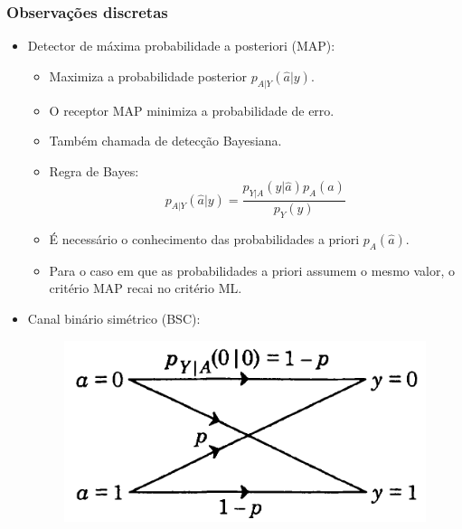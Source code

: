 \begin{frame}
	\frametitle{Observações discretas}

	\begin{itemize}
	    \item Detector de máxima probabilidade a posteriori (MAP):
	    \begin{itemize}
	      \item Maximiza a probabilidade posterior $p_{A|Y}(\hat{a}|y)$.
	      \item O receptor MAP minimiza a probabilidade de erro.
	      \item Também chamada de detecção Bayesiana.
	      \item Regra de Bayes:
	      \begin{equation*}
		  p_{A|Y}(\hat{a}|y) = \frac{p_{Y|A}(y|\hat{a}) p_A(\hat{a})}{p_Y(y)}
	      \end{equation*}
	      \item É necessário o conhecimento das probabilidades a priori $p_A(\hat{a})$.
	      \item Para o caso em que as probabilidades a priori assumem o mesmo valor, o critério MAP recai no critério ML.
	    \end{itemize}
	    \item Canal binário simétrico (BSC):
	    \begin{figure}[t]	
	      \begin{center}
		\includegraphics[width=0.35\columnwidth]{figs/detec_02}
	      \end{center}
	    \end{figure}
	\end{itemize}			
\end{frame}

